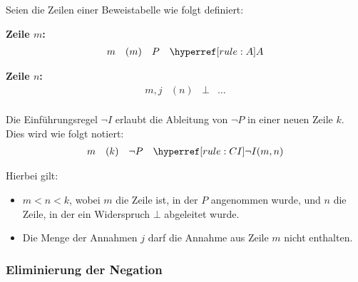 \documentclass[main.tex]{subfiles}
\begin{document}
\begin{definition}
Seien die Zeilen einer Beweistabelle wie folgt definiert:

\textbf{Zeile \(m\):}
\[
\begin{array}{llll}
    m & (m) & P & \rA \\
\end{array}
\]

\textbf{Zeile \(n\):}
\[
\begin{array}{llll}
    m,j & (n) & \bot & \dots \\
\end{array}
\]

Die Einführungsregel \(\neg I\) erlaubt die Ableitung von \(\neg P\) in einer neuen Zeile \(k\). Dies wird wie folgt notiert:
\[
\begin{array}{llll}
    m & (k) & \neg P & \rCI{m,n} \\
\end{array}
\]

Hierbei gilt:
\begin{itemize}
    \item \(m < n < k\), wobei \(m\) die Zeile ist, in der \(P\) angenommen wurde, und \(n\) die Zeile, in der ein Widerspruch \(\bot\) abgeleitet wurde.
    \item Die Menge der Annahmen \(j\) darf die Annahme aus Zeile \(m\) nicht enthalten.
\end{itemize}
\end{definition}

\subsubsection{Eliminierung der Negation}
\label{rule:CE}
\end{document}

